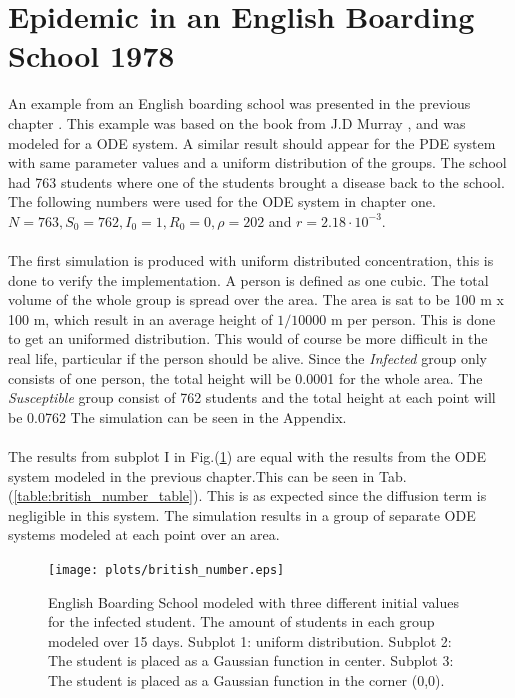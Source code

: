 \documentclass[%
twoside,                 %
final,                   %
10pt]{article}
\begin{document}
\section{Epidemic in an English Boarding School 1978}
An example from an English boarding school was presented in the previous chapter . This example was based on the book from J.D Murray \cite{murray2002mathematical}, and was modeled for a ODE system. A similar result should appear for the PDE system with same parameter values and a uniform distribution of the groups. The school had 763 students where one of the students brought a disease back to the school. The following numbers were used for the ODE system in chapter one. $N=763, S_0=762,I_0=1,R_0=0,\rho=202$ and $r = 2.18\cdot 10^{-3}$. 
\\
\\
The first simulation is produced with uniform distributed concentration, this is done to verify the implementation. A person is defined as one cubic. The total volume of the whole group is spread over the area. The area is sat to be 100 m x 100 m, which result in an average height of $1/10000$ m per person. This is done to get an uniformed distribution. This would of course be more difficult in the real life, particular if the person should be alive. Since the \emph{Infected} group only consists of one person, the total height will be 0.0001 for the whole area. The \emph{Susceptible} group consist of 762 students and the total height at each point will be 0.0762 The simulation can be seen in the Appendix. 
\\
\\
The results from subplot I in Fig.(\ref{fig:british_number}) are equal with the results from the ODE system modeled in the previous chapter.This can be seen in Tab.(\ref{table:british_number_table}). This is as expected since the diffusion term is negligible in this system. The simulation results in a group of separate ODE systems modeled at each point over an area.


\begin{figure}[ht]
  \centerline{\texttt{[image: plots/british\_number.eps]}}
  \caption{
  \label{fig:british_number} English Boarding School modeled with three different initial values for the infected student. The amount of students in each group modeled over 15 days. Subplot 1: uniform distribution. Subplot 2: The student is placed as a Gaussian function in center. Subplot 3: The student is placed as a Gaussian function in the corner (0,0).
  }
\end{figure}
\end{document}
